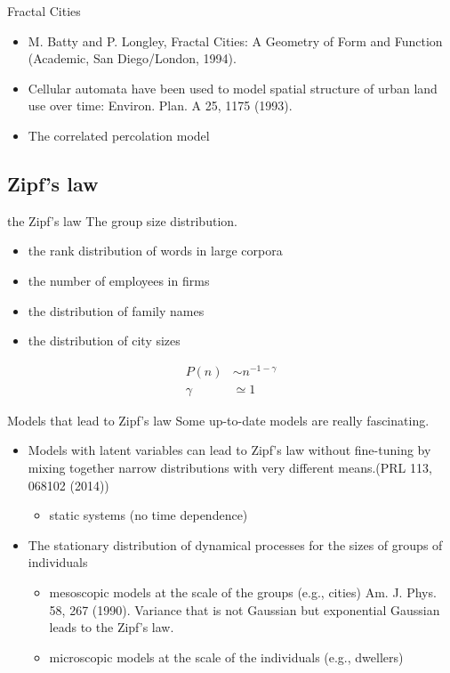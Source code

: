 \documentclass{beamer}
\begin{document}
\begin{frame}{Fractal Cities}
  \begin{itemize}
    \item M. Batty and P. Longley, Fractal Cities: A Geometry of Form
    and Function (Academic, San Diego/London, 1994).
    \item Cellular automata have been used to model spatial structure of urban land use over time: Environ. Plan. A 25, 1175 (1993).
    \item The correlated percolation model
    
  \end{itemize}
\end{frame}

\subsection{Zipf's law}
\begin{frame}{the Zipf's law}
  The group size distribution.
  \begin{itemize}
    \item the rank distribution of words in large corpora
    \item the number of employees in firms
    \item the distribution of family names
    \item the distribution of city sizes
    
  \end{itemize}

  \begin{align}
    P(n)&\sim n^{-1-\gamma}\\
    \gamma&\simeq 1
  \end{align}
  
\end{frame}

\begin{frame}{Models that lead to Zipf's law}
Some up-to-date models are really fascinating.
  \begin{itemize}
    \item Models with latent variables can lead to Zipf's law without fine-tuning by mixing together narrow distributions with very different means.(PRL 113, 068102 (2014))
    \begin{itemize}
      \item static systems (no time dependence)
    \end{itemize}
    \item The stationary distribution of dynamical processes for the sizes of groups of individuals
    \begin{itemize}
      \item mesoscopic models at the scale of the groups (e.g., cities) Am. J. Phys. 58, 267 (1990). Variance that is not Gaussian but exponential Gaussian leads to the Zipf's law.
      \item microscopic models at the scale of the individuals (e.g., dwellers)
    \end{itemize}
  \end{itemize}
  
\end{frame}
\end{document}
